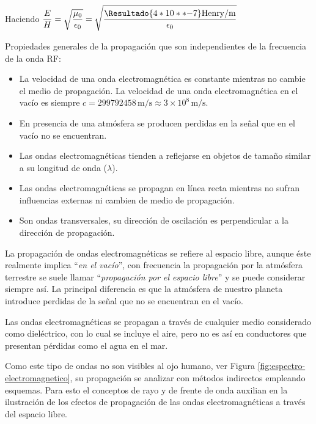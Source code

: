Haciendo $\displaystyle \frac{E}{H} = \sqrt{\frac{\mu_0}{\epsilon_0}} 
= \sqrt{\frac{\Resultado{4 * 10**{-7} }\text{Henry/m}}{\epsilon_0}} 
$

\begin{tcolorbox}{Propiedades generales de la propagaci\'on que son independientes de la frecuencia de la onda RF:}{\small
  \begin{itemize}

  \item La velocidad de una onda electromagn\'etica es constante
    mientras no cambie el medio de propagaci\'on.
 La velocidad de una onda electromagn\'etica en el vac\'io es
    siempre $c = 299792458 \,\text{m/s} \approx 3 \times 10^8 \,\text{m/s}$.

  \item En presencia de una atmósfera se producen perdidas en la señal que en el vacío no se encuentran.

  \item Las ondas electromagn\'eticas tienden a reflejarse en objetos
    de tama\~no similar a su longitud de onda ($\lambda$).

  \item Las ondas electromagn\'eticas se propagan en l\'inea recta
    mientras no sufran influencias externas ni cambien de medio de
    propagaci\'on.

  \item Son ondas transversales, su direcci\'on de oscilaci\'on es perpendicular a la direcci\'on de propagaci\'on.
  \end{itemize}
  }
\end{tcolorbox}

La propagación de ondas  electromagnéticas se refiere al espacio libre, aunque \'este realmente 
implica ``\emph{en el vacío}'', con frecuencia la
propagación por la atmósfera terrestre se suele llamar ``\emph{propagación por el espacio libre}''
 y se puede considerar siempre así. 
La principal diferencia es que la atmósfera de nuestro planeta introduce
perdidas de la señal que no se encuentran en el vacío.

Las ondas electromagnéticas se propagan a través de cualquier medio considerado como  dieléctrico,
con lo cual se incluye el aire, pero no es as\'i en conductores que presentan p\'erdidas como el
agua en el mar.

Como este tipo de ondas no son visibles al ojo humano, ver Figura \ref{fig:espectro-electromagnetico},
 su propagaci\'on  se  analizar con métodos indirectos empleando esquemas. 
Para esto el conceptos de rayo y de frente de onda auxilian en la ilustraci\'on
de los efectos de propagación de las ondas electromagnéticas a través
del espacio libre. 

